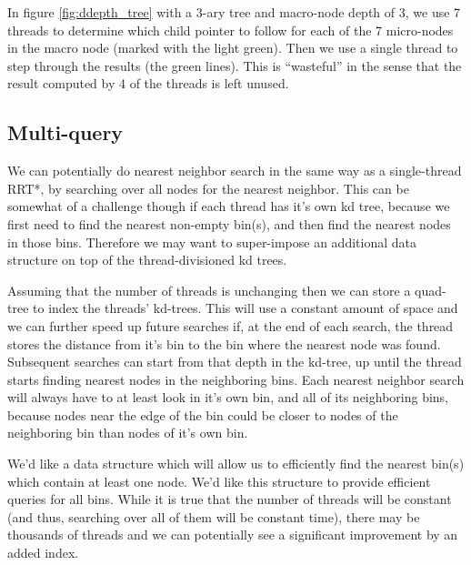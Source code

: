 In figure \ref{fig:ddepth_tree} with a 3-ary tree and macro-node depth of 3, we use 7 threads to determine which child pointer to follow for each of the 7 micro-nodes in the macro node (marked with the light green). Then we use a single thread to step through the results (the green lines). This is ``wasteful'' in the sense that the result computed by 4 of the threads is left unused. 

\subsection{Multi-query}
We can potentially do nearest neighbor search in the same way as a single-thread RRT*, by searching over all nodes for the nearest neighbor. This can be somewhat of a challenge though if each thread has it's own kd tree, because we first need to find the nearest non-empty bin(s), and then find the nearest nodes in those bins. Therefore we may want to super-impose an additional data structure on top of the thread-divisioned kd trees.  

Assuming that the number of threads is unchanging then we can store a quad-tree to index the threads' kd-trees. This will use a constant amount of space and we can further speed up future searches if, at the end of each search, the thread stores the distance from it's bin to the bin where the nearest node was found. Subsequent searches can start from that depth in the kd-tree, up until the thread starts finding nearest nodes in the neighboring bins. Each nearest neighbor search will always have to at least look in it's own bin, and all of its neighboring bins, because nodes near the edge of the bin could be closer to nodes of the neighboring bin than nodes of it's own bin.

\begin{figure}[H]
\begin{centering}
    \texttt{[image: \\figfile\{fig/nonempty\_search]}}
    \caption{Non-empty Search}
    \label{fig:nonempty}
\end{centering}
\end{figure}


We'd like a data structure which will allow us to efficiently find the nearest bin(s) which contain at least one node. We'd like this structure to provide efficient queries for all bins. While it is true that the number of threads will be constant (and thus, searching over all of them will be constant time), there may be thousands of threads and we can potentially see a significant improvement by an added index. 

